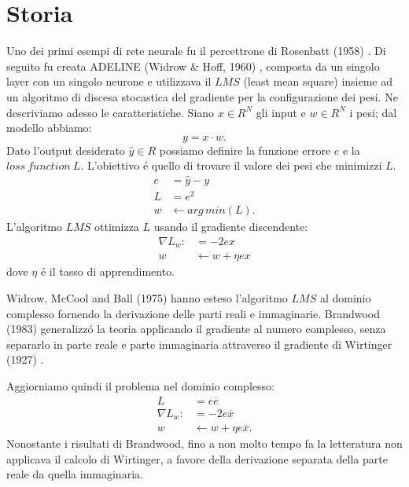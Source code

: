 \documentclass[a4paper,12pt]{report}
\begin{document}
 
 \section{Storia}
 Uno dei primi esempi di rete neurale fu il percettrone di Rosenbatt (1958) \cite{rosenblatt1958perceptron}. Di seguito fu creata ADELINE (Widrow \& Hoff, 1960) \cite{widrow1962generalization}, composta da un singolo layer con un singolo neurone e utilizzava il $LMS$ (least mean square) insieme ad un algoritmo di discesa stocastica del gradiente per la configurazione dei pesi. 
 Ne descriviamo adesso le caratteristiche. Siano $x \in R^N$ gli input e $w \in R^N$ i pesi; dal modello abbiamo:
 \begin{equation}
  y = x \cdot w.
 \end{equation}
 Dato l'output desiderato $\widehat{y} \in R$ possiamo definire la funzione errore $e$ e la $loss \ function \ L$. 
 L'obiettivo \'e quello di trovare il valore dei pesi che minimizzi $L$.
 \begin{align}
  e &= \widehat{y} - y\\
  L &= e^2\\
  w &\leftarrow arg \, min(L).
 \end{align}
 L'algoritmo $LMS$ ottimizza $L$ usando il gradiente discendente:
 \begin{align}
  \nabla L_w: &= -2ex\\
  w &\leftarrow w + \eta ex
 \end{align}
 dove $\eta$ \'e il tasso di apprendimento. 

 Widrow, McCool and Ball (1975) \cite{widrow1975complex} hanno esteso l'algoritmo $LMS$ al dominio complesso fornendo la derivazione delle parti reali e immaginarie. 
 Brandwood (1983) \cite{brandwood1983complex} generalizz\'o la teoria applicando il gradiente al numero complesso, senza separarlo in parte reale e parte immaginaria attraverso il gradiente di Wirtinger (1927) \cite{wirtinger1927formalen}. 

 Aggiorniamo quindi il problema nel dominio complesso:
 \begin{align}
  L &= e \overline{e}\\
  \nabla L_w : &= -2e\overline{x}\\
  w &\leftarrow w + \eta e \overline{x}.
 \end{align}
 Nonostante i risultati di Brandwood, fino a non molto tempo fa la letteratura non applicava il calcolo di Wirtinger, a favore della derivazione separata della parte reale da quella immaginaria. 
 
\end{document}
